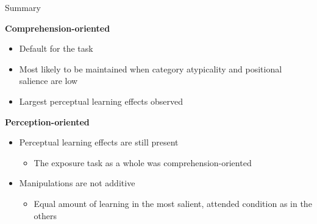 \documentclass{beamer}
\begin{document}
\begin{frame}{Summary}

\textbf{Comprehension-oriented}
\begin{itemize}
\item Default for the task
\item Most likely to be maintained when category atypicality and positional salience are low
\item Largest perceptual learning effects observed
\end{itemize}

\textbf{Perception-oriented}
\begin{itemize}
\item Perceptual learning effects are still present
\begin{itemize}
\item The exposure task as a whole was comprehension-oriented
\end{itemize}
\item Manipulations are not additive
\begin{itemize}
\item Equal amount of learning in the most salient, attended condition as in the others
\end{itemize}
\end{itemize}

\end{frame}
\end{document}
